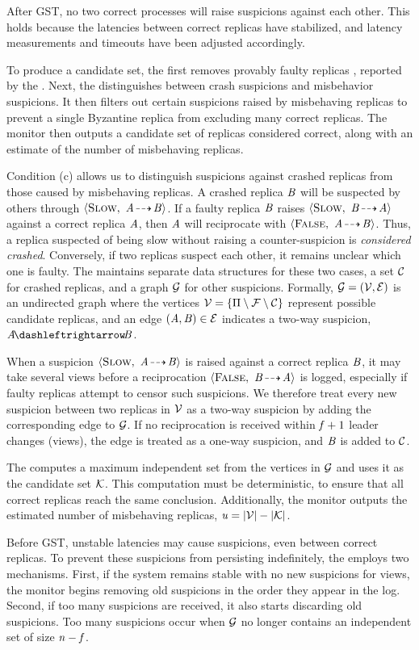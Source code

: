 After \ac{GST}, no two correct processes will raise suspicions against each other.
This holds because the latencies between correct replicas have stabilized, and latency measurements and timeouts have been adjusted accordingly.

To produce a candidate set, the \susmonitor first removes provably faulty replicas \Faulty, reported by the \mismonitor.
Next, the \susmonitor distinguishes between crash suspicions and misbehavior suspicions.
It then filters out certain suspicions raised by misbehaving replicas to prevent a single Byzantine replica from excluding many correct replicas.
The monitor then outputs a candidate set of replicas considered correct, along with an estimate of the number of misbehaving replicas.

Condition (c) allows us to distinguish suspicions against crashed replicas from those caused by misbehaving replicas.
A crashed replica $\mathit{B}$ will be suspected by others through $\langle \textsc{Slow},\ \mathit{A}\!\dashrightarrow\!\mathit{B} \rangle$.
If a faulty replica $\mathit{B}$ raises $\langle \textsc{Slow},\ \mathit{B}\!\dashrightarrow\!\mathit{A} \rangle$ against a correct replica $\mathit{A}$, then $\mathit{A}$ will reciprocate with $\langle \textsc{False},\ \mathit{A}\!\dashrightarrow\!\mathit{B} \rangle$.
Thus, a replica suspected of being slow without raising a counter-suspicion is \textit{considered crashed}.
Conversely, if two replicas suspect each other, it remains unclear which one is faulty.
The \susmonitor maintains separate data structures for these two cases, a set $\mathcal{C}$ for crashed replicas, and a graph $\mathcal{G}$ for other suspicions.
Formally, $\mathcal{G}=(\mathcal{V},\mathcal{E})$ is an undirected graph where the vertices $\mathcal{V}=\{\Pi\setminus\mathcal{F}\setminus\mathcal{C}\}$ represent possible candidate replicas, and an edge $(\mathit{A}, \mathit{B}) \in \mathcal{E}$ indicates a two-way suspicion, $\susptwo{\na}{\nb}$.

When a suspicion $\langle \textsc{Slow},\ \mathit{A}\!\dashrightarrow\!\mathit{B} \rangle$ is raised against a correct replica $\mathit{B}$, it may take several views before a reciprocation $\langle \textsc{False},\ \mathit{B}\!\dashrightarrow\!\mathit{A} \rangle$ is logged, especially if faulty replicas attempt to censor such suspicions.
We therefore treat every new suspicion between two replicas in $\mathcal{V}$ as a two-way suspicion by adding the corresponding edge to $\mathcal{G}$.
If no reciprocation is received within $\mathit{f}+1$ leader changes (views), the edge is treated as a one-way suspicion, and $\mathit{B}$ is added to $\mathcal{C}$.

The \susmonitor computes a maximum independent set from the vertices in $\mathcal{G}$ and uses it as the candidate set $\mathcal{K}$.
This computation must be deterministic, to ensure that all correct replicas reach the same conclusion.
Additionally, the monitor outputs the estimated number of misbehaving replicas, $\mathit{u}=|\mathcal{V}|-|\mathcal{K}|$.

Before GST, unstable latencies may cause suspicions, even between correct replicas.
To prevent these suspicions from persisting indefinitely, the \susmonitor employs two mechanisms.
First, if the system remains stable with no new suspicions for \winlen views, the monitor begins removing old suspicions in the order they appear in the log.
Second, if too many suspicions are received, it also starts discarding old suspicions.
Too many suspicions occur when $\mathcal{G}$ no longer contains an independent set of size $\mathit{n}-\mathit{f}$.
